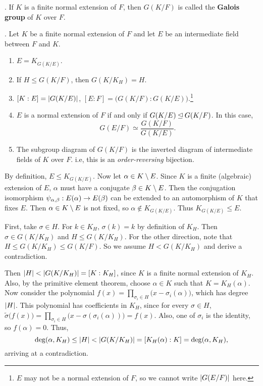 .  If \(K\) is a finite normal extension of \(F\), then \(G(K/F)\) is called the \textbf{Galois group} of \(K\) over \(F\).

\thm.  Let \(K\) be a finite normal extension of \(F\) and let \(E\) be an intermediate field between \(F\) and \(K\).
\begin{enumerate}
    \item \(E = K_{G(K/E)}\).
    \item If \(H \leq G(K/F)\), then \(G(K/K_H) = H\).
    \item \([K : E] = \left| G(K/E) \right|\), \([E : F] = \bigl(G(K/F) : G(K/E)\bigr)\).\footnote{\(E\) may not be a normal extension of \(F\), so we cannot write \(\left| G(E/F) \right|\) here.}
    \item \(E\) is a normal extension of \(F\) if and only if \(G(K/E) \unlhd G(K/F)\). In this case,
          \[
              G(E/F) \simeq \frac{G(K/F)}{G(K/E)}.
          \]
    \item The subgroup diagram of \(G(K/F)\) is the inverted diagram of intermediate fields of \(K\) over \(F\). i.e, this is an \textit{order-reversing} bijection.
\end{enumerate}

\pf {} By definition, \(E \leq K_{G(K/E)}\). Now let \(\alpha \in K \setminus E\). Since \(K\) is a finite (algebraic) extension of \(E\), \(\alpha\) must have a conjugate \(\beta \in K \setminus E\). Then the conjugation isomorphism \(\psi_{\alpha, \beta} : E(\alpha) \rightarrow E(\beta)\) can be extended to an automorphism of \(K\) that fixes \(E\). Then \(\alpha \in K \setminus E\) is not fixed, so \(\alpha \notin K_{G(K/E)}\). Thus \(K_{G(K/E)} \leq E\).


 First, take \(\sigma \in H\). For \(k \in K_H\), \(\sigma(k) = k\) by definition of \(K_H\). Then \(\sigma \in G(K/K_H)\) and \(H \leq G(K/K_H)\). For the other direction, note that \(H \leq G(K/K_H) \leq G(K/F)\). So we assume \(H < G(K/K_H)\) and derive a contradiction.

Then \(\left| H \right| < \left| G(K/K_H) \right| = [K : K_H]\), since \(K\) is a finite normal extension of \(K_H\). Also, by the primitive element theorem, choose \(\alpha \in K\) such that \(K = K_H(\alpha)\). Now consider the polynomial \(f(x) = \prod_{\sigma_i \in H}\bigl(x - \sigma_i(\alpha)\bigr)\), which has degree \(\left| H \right|\). This polynomial has coefficients in \(K_H\), since for every \(\sigma \in H\), \(\tilde{\sigma}\bigl(f(x)\bigr) = \prod_{\sigma_i \in H}\bigl(x - \sigma(\sigma_i(\alpha))\bigr) = f(x)\). Also, one of \(\sigma_i\) is the identity, so \(f(\alpha) = 0\). Thus,
\[
    \deg(\alpha, K_H) \leq \left| H \right| < \left| G(K/K_H) \right| = [K_H(\alpha) : K] = \deg(\alpha, K_H),
\]
arriving at a contradiction.

